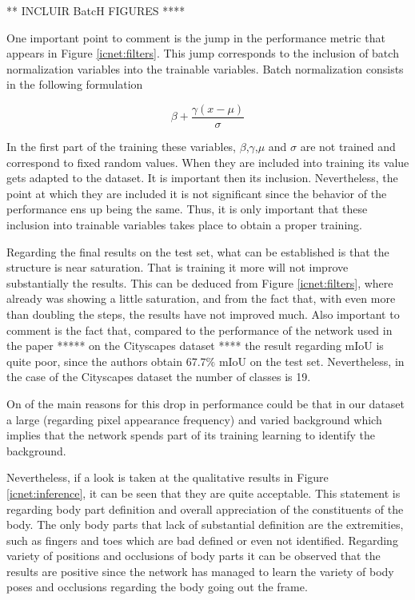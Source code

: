 \documentclass[12pt,a4paper]{article}
\begin{document}
** INCLUIR BatcH FIGURES ****

One important point to comment is the jump in the performance metric that appears in Figure \ref{icnet:filters}. This jump corresponds to the inclusion of batch normalization variables into the trainable variables. Batch normalization consists in the following formulation\newline

\begin{equation}
\beta +\frac{\gamma(x-\mu)}{\sigma}
\end{equation}

In the first part of the training these variables, $\beta$,$\gamma$,$\mu$ and $\sigma$ are not trained and correspond to fixed random values. When they are included into training its value gets adapted to the dataset. It is important then its inclusion. Nevertheless, the point at which they are included it is not significant since the behavior of the performance ens up being the same. Thus, it is only important that these inclusion into trainable variables takes place to obtain a proper training.\newline 

Regarding the final results on the test set, what can be established is that the structure is near saturation. That is training it more will not improve substantially the results. This can be deduced from Figure \ref{icnet:filters}, where already was showing a little saturation, and from the fact that, with even more than doubling the steps, the results have not improved much. Also important to comment is the fact that, compared to the performance of the network used in the paper ***** on the Cityscapes dataset **** the result regarding mIoU is quite poor, since the authors obtain 67.7$\%$ mIoU on the test set. Nevertheless, in the case of the Cityscapes dataset the number of classes is 19.\newline

On of the main reasons for this drop in performance could be that in our dataset a large (regarding pixel appearance frequency) and varied background which implies that the network spends part of its training learning to identify the background.\newline

Nevertheless, if a look is taken at the qualitative results in Figure \ref{icnet:inference}, it can be seen that they are quite acceptable. This statement is regarding body part definition and overall appreciation of the  constituents of the body. The only body parts that lack of substantial definition are the extremities, such as fingers and toes which are bad defined or even not identified. Regarding variety of positions and occlusions of  body parts it can be observed that the results are positive since the network has managed to learn the variety of body poses and occlusions regarding the body going out the frame.\newline
\end{document}
